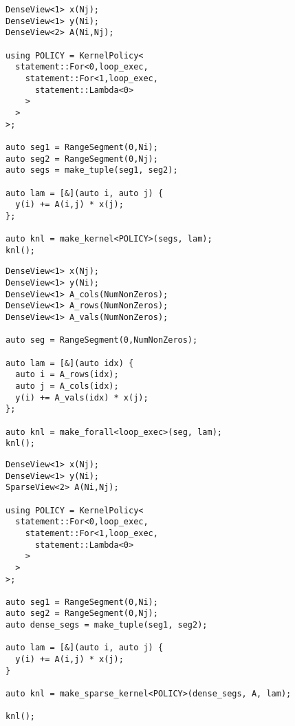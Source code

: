 \begin{figure}
\begin{lstlisting}[caption={RAJA implementation of dense matrix vector multiplication.},label=DenseMV]
DenseView<1> x(Nj);
DenseView<1> y(Ni);
DenseView<2> A(Ni,Nj);

using POLICY = KernelPolicy<
  statement::For<0,loop_exec,
    statement::For<1,loop_exec,
      statement::Lambda<0>
    >
  >
>;

auto seg1 = RangeSegment(0,Ni);
auto seg2 = RangeSegment(0,Nj);
auto segs = make_tuple(seg1, seg2);

auto lam = [&](auto i, auto j) {
  y(i) += A(i,j) * x(j);
};

auto knl = make_kernel<POLICY>(segs, lam);
knl();
\end{lstlisting}
\end{figure}
\begin{figure}
\begin{lstlisting}[caption={RAJA implementation of sparse matrix vector multiplication, specialized for COO storage.},label=SpecializedMV]
DenseView<1> x(Nj);
DenseView<1> y(Ni);
DenseView<1> A_cols(NumNonZeros);
DenseView<1> A_rows(NumNonZeros);
DenseView<1> A_vals(NumNonZeros);

auto seg = RangeSegment(0,NumNonZeros);

auto lam = [&](auto idx) {
  auto i = A_rows(idx);
  auto j = A_cols(idx);
  y(i) += A_vals(idx) * x(j);
};

auto knl = make_forall<loop_exec>(seg, lam);
knl();
\end{lstlisting}
\end{figure}
\begin{figure}
\begin{lstlisting}[caption={Implementation of SpMV using the SparseRAJA prototype},label=SparseRAJAMV]
DenseView<1> x(Nj);
DenseView<1> y(Ni);
SparseView<2> A(Ni,Nj);

using POLICY = KernelPolicy<
  statement::For<0,loop_exec,
    statement::For<1,loop_exec,
      statement::Lambda<0>
    >
  >
>;

auto seg1 = RangeSegment(0,Ni);
auto seg2 = RangeSegment(0,Nj);
auto dense_segs = make_tuple(seg1, seg2);

auto lam = [&](auto i, auto j) {
  y(i) += A(i,j) * x(j);
}

auto knl = make_sparse_kernel<POLICY>(dense_segs, A, lam);
  
knl();
\end{lstlisting}
\end{figure}



